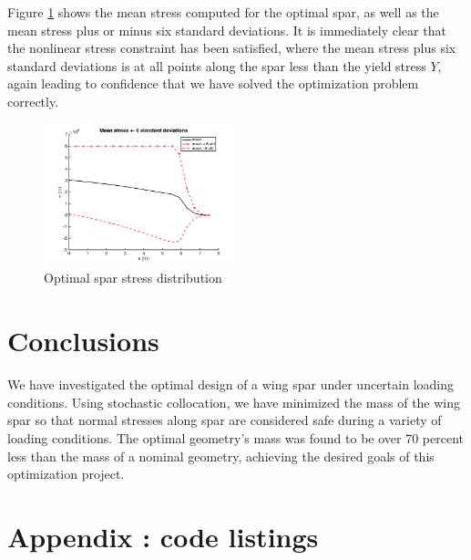\documentclass[10pt]{article}
\begin{document}
Figure \ref{fig:optimal_stress} shows the mean stress computed
for the optimal spar, as well as the mean stress plus or minus
six standard deviations. It is immediately clear that the
nonlinear stress constraint has been satisfied, where the
mean stress plus six standard deviations is at all points
along the spar less than the yield stress $Y$, again leading
to confidence that we have solved the optimization problem
correctly.
%
\begin{figure}[hbt!]
\centering
\includegraphics[width=0.5\textwidth]{optimal_stress}
\caption{Optimal spar stress distribution}
\label{fig:optimal_stress}
\end{figure}

\section{Conclusions}

We have investigated the optimal design of a wing
spar under uncertain loading conditions. Using
stochastic collocation, we have minimized the mass of
the wing spar so that normal stresses along spar are
considered safe during a variety of loading conditions.
The optimal geometry's mass was found to be over 70
percent less than the mass of a nominal geometry,
achieving the desired goals of this optimization
project.

\newpage

\section{Appendix : code listings}


\newpage

\newpage

\newpage

\newpage

\end{document}
